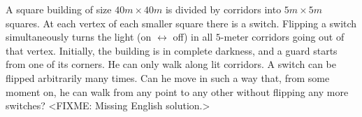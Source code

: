 \problem
A square building of size $40 m \times 40 m$ is divided by corridors into
$5 m \times 5 m$ squares.
At each vertex of each smaller square there is a switch.
Flipping a switch simultaneously turns the light (on $\leftrightarrow$ off) in
all $5$-meter corridors going out of that vertex.
Initially, the building is in complete darkness, and a guard starts from one of
its corners.
He can only walk along lit corridors.
A switch can be flipped arbitrarily many times.
Can he move in such a way that, from some moment on, he can walk from any point
to any other without flipping any more switches?
\solution
<FIXME: Missing English solution.>
\endproblem
